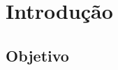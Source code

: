 \documentclass[../../layout.tex]{subfiles}
\begin{document}
\chapter{Introdução}
\blindtext
\section{Objetivo}
\blindtext
\end{document}
